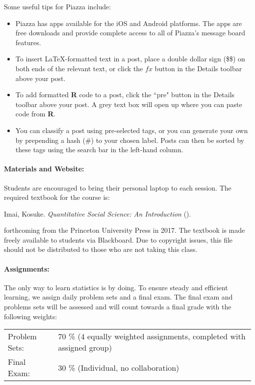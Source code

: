 \documentclass[12pt]{article}
\begin{document}
Some useful tips for Piazza include: 
\begin{itemize}
\item Piazza  has apps available for the iOS and Android platforms. The apps are free downloads and provide complete access to all of Piazza's message board features.

\item To insert \LaTeX-formatted text in a post, place a double dollar sign (\$\$) on both ends of the relevant text, or click the $fx$ button in the Details toolbar above your post.

\item To add formatted \textbf{\textsf{R}} code to a post, click the
  ``pre" button in the Details toolbar above your post. A grey text
  box will open up where you can paste code from \textbf{\textsf{R}}.

\item You can classify a post using pre-selected tags, or you can generate your own by prepending a hash (\#) to 
your chosen label. Posts can then be sorted by these tags using the search bar in the left-hand column.

\end{itemize}

\paragraph{Materials and Website:} Students are encouraged to bring
their personal laptop to each session. The required textbook for the
course is:
\begin{center}
  Imai, Kosuke. {\it Quantitative Social Science: An Introduction}
  (\QSS).
\end{center}
forthcoming from the Princeton University Press in 2017. The textbook
is made freely available to students via Blackboard. Due to
copyright issues, this file should not be distributed to those who are not taking this class.

\paragraph{Assignments:} The only way to learn statistics is by doing.
To ensure steady and efficient learning, we assign daily problem sets
and a final exam. The final exam and problems sets will be assessed
and will count towards a final grade with the following weights:

\begin{flushleft}
\begin{tabular}{ll}
Problem Sets: & 70 \% (4 equally weighted assignments, completed with assigned group)\\
Final Exam: & 30 \% (Individual, no collaboration) \\
\end{tabular}
\end{flushleft}
\end{document}
